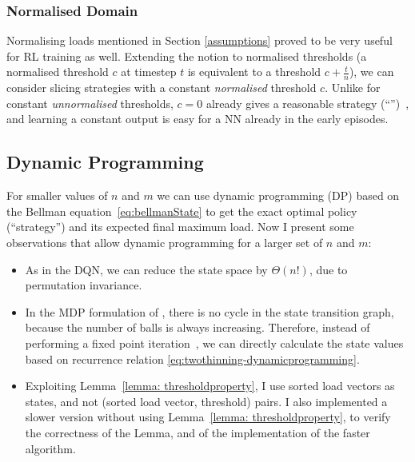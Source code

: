 \subsubsection{Normalised Domain} \label{normalised-domain}

Normalising loads mentioned in Section \ref{assumptions} proved to be very useful for RL training as well. Extending the notion to normalised thresholds (a normalised threshold $c$ at timestep $t$ is equivalent to a threshold $c+\frac{t}{n}$), we can consider slicing strategies with a constant \textit{normalised} threshold $c$. Unlike for constant \textit{unnormalised} thresholds, $c=0$ already gives a reasonable strategy (``\MeanThinning'')~\cite{los2022cachingpackingthinningtwinning}, and learning a constant output is easy for a NN already in the early episodes.


\subsection{Dynamic Programming} \label{two-thinning-dp}


For smaller values of $n$ and $m$ we can use dynamic programming (DP) based on the Bellman equation~\eqref{eq:bellmanState} to get the exact optimal policy (``\DP strategy'') and its expected final maximum load. Now I present some observations that allow dynamic programming for a larger set of $n$ and $m$:


\begin{itemize}
    \item 
    As in the DQN, we can reduce the state space by $\Theta(n!)$, due to permutation invariance.
    \item
    In the MDP formulation of \TwoThinning, there is no cycle in the state transition graph, because the number of balls is always increasing. Therefore, instead of performing a fixed point iteration~\cite{rhoades1991fixedpointiteration}, we can directly calculate the state values based on recurrence relation \eqref{eq:twothinning-dynamicprogramming}.
    \item
    Exploiting Lemma~\ref{lemma: thresholdproperty}, I use sorted load vectors as states, and not (sorted load vector, threshold) pairs. I also implemented a slower version without using Lemma~\ref{lemma: thresholdproperty}, to verify the correctness of the Lemma, and of the implementation of the faster algorithm.
\end{itemize}


